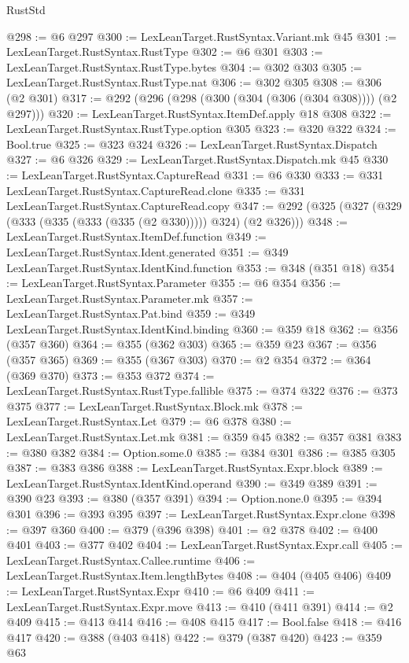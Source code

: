 \begin{lexlean}{RustStd}
\begin{coremodule}
@298 := @6 @297
@300 := LexLeanTarget.RustSyntax.Variant.mk @45
@301 := LexLeanTarget.RustSyntax.RustType
@302 := @6 @301
@303 := LexLeanTarget.RustSyntax.RustType.bytes
@304 := @302 @303
@305 := LexLeanTarget.RustSyntax.RustType.nat
@306 := @302 @305
@308 := @306 (@2 @301)
@317 := @292 (@296 (@298 (@300 (@304 (@306 (@304 @308)))) (@2 @297)))
@320 := LexLeanTarget.RustSyntax.ItemDef.apply @18 @308
@322 := LexLeanTarget.RustSyntax.RustType.option @305
@323 := @320 @322
@324 := Bool.true
@325 := @323 @324
@326 := LexLeanTarget.RustSyntax.Dispatch
@327 := @6 @326
@329 := LexLeanTarget.RustSyntax.Dispatch.mk @45
@330 := LexLeanTarget.RustSyntax.CaptureRead
@331 := @6 @330
@333 := @331 LexLeanTarget.RustSyntax.CaptureRead.clone
@335 := @331 LexLeanTarget.RustSyntax.CaptureRead.copy
@347 := @292 (@325 (@327 (@329 (@333 (@335 (@333 (@335 (@2 @330))))) @324) (@2 @326)))
@348 := LexLeanTarget.RustSyntax.ItemDef.function
@349 := LexLeanTarget.RustSyntax.Ident.generated
@351 := @349 LexLeanTarget.RustSyntax.IdentKind.function
@353 := @348 (@351 @18)
@354 := LexLeanTarget.RustSyntax.Parameter
@355 := @6 @354
@356 := LexLeanTarget.RustSyntax.Parameter.mk
@357 := LexLeanTarget.RustSyntax.Pat.bind
@359 := @349 LexLeanTarget.RustSyntax.IdentKind.binding
@360 := @359 @18
@362 := @356 (@357 @360)
@364 := @355 (@362 @303)
@365 := @359 @23
@367 := @356 (@357 @365)
@369 := @355 (@367 @303)
@370 := @2 @354
@372 := @364 (@369 @370)
@373 := @353 @372
@374 := LexLeanTarget.RustSyntax.RustType.fallible
@375 := @374 @322
@376 := @373 @375
@377 := LexLeanTarget.RustSyntax.Block.mk
@378 := LexLeanTarget.RustSyntax.Let
@379 := @6 @378
@380 := LexLeanTarget.RustSyntax.Let.mk
@381 := @359 @45
@382 := @357 @381
@383 := @380 @382
@384 := Option.some.{0}
@385 := @384 @301
@386 := @385 @305
@387 := @383 @386
@388 := LexLeanTarget.RustSyntax.Expr.block
@389 := LexLeanTarget.RustSyntax.IdentKind.operand
@390 := @349 @389
@391 := @390 @23
@393 := @380 (@357 @391)
@394 := Option.none.{0}
@395 := @394 @301
@396 := @393 @395
@397 := LexLeanTarget.RustSyntax.Expr.clone
@398 := @397 @360
@400 := @379 (@396 @398)
@401 := @2 @378
@402 := @400 @401
@403 := @377 @402
@404 := LexLeanTarget.RustSyntax.Expr.call
@405 := LexLeanTarget.RustSyntax.Callee.runtime
@406 := LexLeanTarget.RustSyntax.Item.lengthBytes
@408 := @404 (@405 @406)
@409 := LexLeanTarget.RustSyntax.Expr
@410 := @6 @409
@411 := LexLeanTarget.RustSyntax.Expr.move
@413 := @410 (@411 @391)
@414 := @2 @409
@415 := @413 @414
@416 := @408 @415
@417 := Bool.false
@418 := @416 @417
@420 := @388 (@403 @418)
@422 := @379 (@387 @420)
@423 := @359 @63

\end{coremodule}
\end{lexlean}
